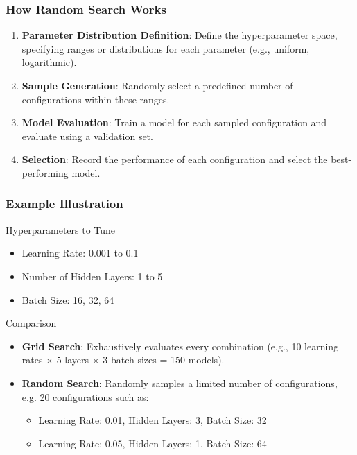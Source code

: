 \documentclass[aspectratio=169]{beamer}
\begin{document}
\begin{frame}[fragile]
    \frametitle{How Random Search Works}
    \begin{enumerate}
        \item \textbf{Parameter Distribution Definition}: Define the hyperparameter space, specifying ranges or distributions for each parameter (e.g., uniform, logarithmic).
        \item \textbf{Sample Generation}: Randomly select a predefined number of configurations within these ranges.
        \item \textbf{Model Evaluation}: Train a model for each sampled configuration and evaluate using a validation set.
        \item \textbf{Selection}: Record the performance of each configuration and select the best-performing model.
    \end{enumerate}
\end{frame}

\begin{frame}[fragile]
    \frametitle{Example Illustration}
    \begin{block}{Hyperparameters to Tune}
        \begin{itemize}
            \item Learning Rate: 0.001 to 0.1
            \item Number of Hidden Layers: 1 to 5
            \item Batch Size: 16, 32, 64
        \end{itemize}
    \end{block}
    
    \begin{block}{Comparison}
        \begin{itemize}
            \item \textbf{Grid Search}: Exhaustively evaluates every combination (e.g., 10 learning rates × 5 layers × 3 batch sizes = 150 models).
            \item \textbf{Random Search}: Randomly samples a limited number of configurations, e.g. 20 configurations such as:
            \begin{itemize}
                \item Learning Rate: 0.01, Hidden Layers: 3, Batch Size: 32
                \item Learning Rate: 0.05, Hidden Layers: 1, Batch Size: 64
            \end{itemize}
        \end{itemize}
    \end{block}
\end{frame}
\end{document}
